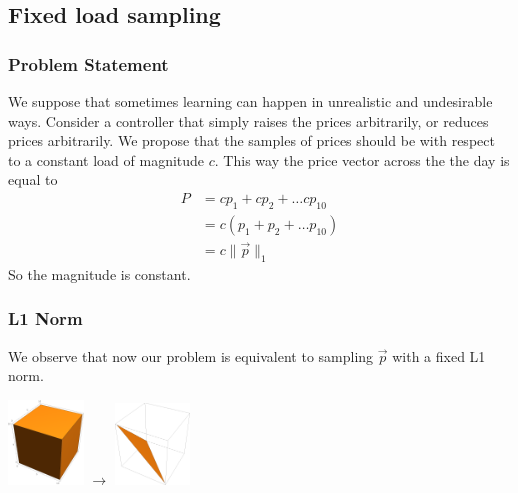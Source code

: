 \subsection{Fixed load sampling}
\subsubsection{Problem Statement}
We suppose that sometimes learning can happen in unrealistic and undesirable ways. 
Consider a controller that simply raises the prices arbitrarily, or reduces prices arbitrarily. 
We propose that the samples of prices should be with respect to a constant load of magnitude $ c$. 
This way the price vector across the the day is equal to 
\begin{align*}
  P &= c p_1 + c p_2 + \ldots c p_{10} \\
    &= c(p_1 + p_2 + \ldots p_{10}) \\
    &= c \lVert \vec{p} \rVert_1
\end{align*}
So the magnitude is constant. 
\subsubsection{L1 Norm}
We observe that now our problem is equivalent to sampling $ \vec{p}$ with a fixed L1 norm. 

\includegraphics[width=2cm]{graphics/box_uniform.png} $\rightarrow$  \includegraphics[width=2cm]{graphics/tri_uniform.png}
    
    

